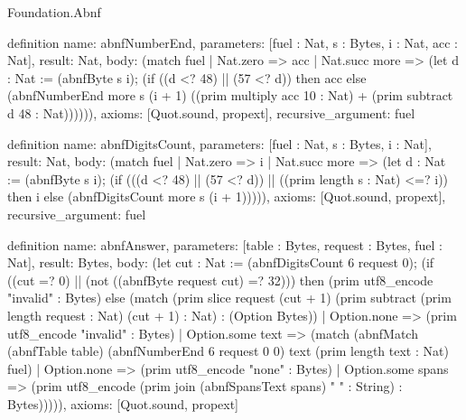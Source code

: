 \begin{lexlean}{Foundation.Abnf}
\begin{semanticmodule}
definition{
  name: abnfNumberEnd,
  parameters: [fuel : Nat, s : Bytes, i : Nat, acc : Nat],
  result: Nat,
  body: (match fuel
    | Nat.zero => acc
    | Nat.succ more => (let d : Nat := (abnfByte s i); (if ((d <? 48) || (57 <? d)) then acc else (abnfNumberEnd more s (i + 1) ((prim multiply acc 10 : Nat) + (prim subtract d 48 : Nat)))))),
  axioms: [Quot.sound, propext],
  recursive_argument: fuel
}

definition{
  name: abnfDigitsCount,
  parameters: [fuel : Nat, s : Bytes, i : Nat],
  result: Nat,
  body: (match fuel
    | Nat.zero => i
    | Nat.succ more => (let d : Nat := (abnfByte s i); (if (((d <? 48) || (57 <? d)) || ((prim length s : Nat) <=? i)) then i else (abnfDigitsCount more s (i + 1))))),
  axioms: [Quot.sound, propext],
  recursive_argument: fuel
}

definition{
  name: abnfAnswer,
  parameters: [table : Bytes, request : Bytes, fuel : Nat],
  result: Bytes,
  body: (let cut : Nat := (abnfDigitsCount 6 request 0); (if ((cut =? 0) || (not ((abnfByte request cut) =? 32))) then (prim utf8_encode "invalid" : Bytes) else (match (prim slice request (cut + 1) (prim subtract (prim length request : Nat) (cut + 1) : Nat) : (Option Bytes))
    | Option.none => (prim utf8_encode "invalid" : Bytes)
    | Option.some text => (match (abnfMatch (abnfTable table) (abnfNumberEnd 6 request 0 0) text (prim length text : Nat) fuel)
      | Option.none => (prim utf8_encode "none" : Bytes)
      | Option.some spans => (prim utf8_encode (prim join (abnfSpansText spans) " " : String) : Bytes))))),
  axioms: [Quot.sound, propext]
}
\end{semanticmodule}
\end{lexlean}

